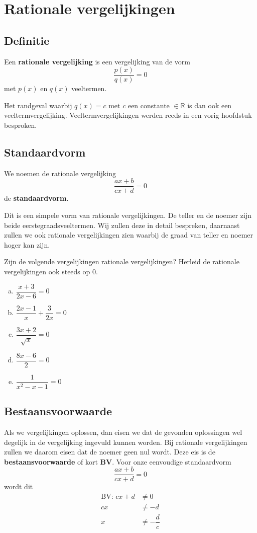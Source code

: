 \documentclass[12pt]{article}
\begin{document}
\pagebreak
\section{Rationale vergelijkingen}

\subsection{Definitie}

\begin{mdframed}
Een {\bf rationale vergelijking} is een vergelijking van de vorm
$$\dfrac{p(x)}{q(x)}=0$$
met $p(x)$ en $q(x)$ veeltermen.
\end{mdframed}

Het randgeval waarbij $q(x)=c$ met $c$ een constante $\in \mathbb{R}$ is dan ook een veeltermvergelijking. Veeltermvergelijkingen werden reeds in een vorig hoofdstuk besproken.

\subsection{Standaardvorm}

\begin{mdframed}
We noemen de rationale vergelijking
$$\dfrac{ax+b}{cx+d}=0$$
de {\bf standaardvorm}.
\end{mdframed}
Dit is een simpele vorm van rationale vergelijkingen. De teller en de noemer zijn beide eerstegraadsveeltermen. Wij zullen deze in detail bespreken, daarnaast zullen we ook rationale vergelijkingen zien waarbij de graad van teller en noemer hoger kan zijn.

\begin{oefening}
Zijn de volgende vergelijkingen rationale vergelijkingen? Herleid de rationale vergelijkingen ook steeds op 0.\\
\begin{enumerate}[(a)]
  \itemsep1em
  \item $\dfrac{x+3}{2x-6}=0$
  \item $\dfrac{2x-1}{x}+\dfrac{3}{2x}=0$
  \item $\dfrac{3x+2}{\sqrt{x}}=0$
  \item $\dfrac{8x-6}{2}=0$
  \item $\dfrac{1}{x^2-x-1}=0$
\end{enumerate}
\end{oefening}


\subsection{Bestaansvoorwaarde}
Als we vergelijkingen oplossen, dan eisen we dat de gevonden oplossingen wel degelijk in de vergelijking ingevuld kunnen worden. Bij rationale vergelijkingen zullen we daarom eisen dat de noemer geen nul wordt. Deze eis is de {\bf bestaansvoorwaarde} of kort {\bf BV}. Voor onze eenvoudige standaardvorm
$$\dfrac{ax+b}{cx+d}=0$$
wordt dit
\begin{align*}
  \mbox{BV: } cx+d &\neq 0\\
                cx &\neq -d\\
                 x &\neq -\dfrac{d}{c}
\end{align*}
\end{document}
